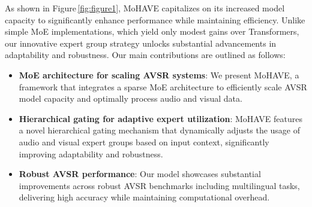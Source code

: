 As shown in Figure\,\ref{fig:figure1}, MoHAVE capitalizes on its increased model capacity to significantly enhance performance while maintaining efficiency. Unlike simple MoE implementations, which yield only modest gains over Transformers, our innovative expert group strategy unlocks substantial advancements in adaptability and robustness.
%
Our main contributions are outlined as follows:
\vspace{-10pt}
\begin{itemize}[leftmargin=10pt, label={$\circ$}]
\setlength\itemsep{-0.1em}
    \vspace*{-2pt}
    \item \textbf{MoE architecture for scaling AVSR systems}: We present MoHAVE, a framework that integrates a sparse MoE architecture to efficiently scale AVSR model capacity and optimally process audio and visual data.
    \vspace*{-2pt}
    \item \textbf{Hierarchical gating for adaptive expert utilization}: MoHAVE features a novel hierarchical gating mechanism that dynamically adjusts the usage of audio and visual expert groups based on input context, significantly improving adaptability and robustness.
    \vspace*{-2pt}
    \item \textbf{Robust AVSR performance}: Our model showcases substantial improvements across robust AVSR benchmarks including multilingual tasks, delivering high accuracy while maintaining computational overhead.
\end{itemize}